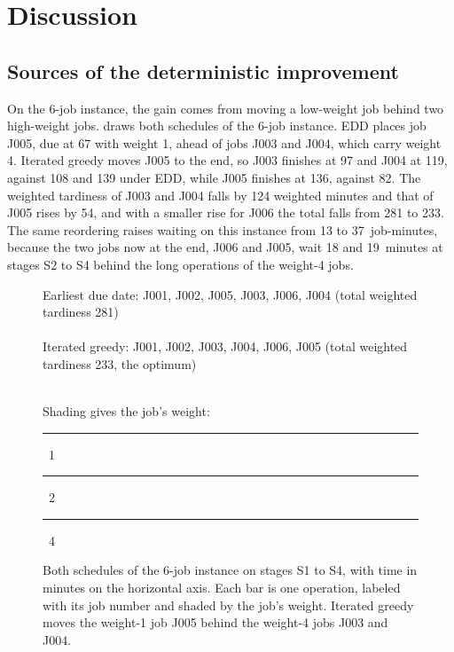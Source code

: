 \section{Discussion}\label{sec:discussion}

\subsection{Sources of the deterministic improvement}\label{sec:gain}

\sumpara On the 6-job instance, the gain comes from moving a low-weight job behind two high-weight jobs. \sumparaend
\fin {} draws both schedules of the 6-job instance. \fine
\fin EDD places job J005, due at 67 with weight 1, ahead of jobs J003 and J004, which carry weight 4. \fine
\fin Iterated greedy moves J005 to the end, so J003 finishes at 97 and J004 at 119, against 108 and 139 under EDD, while J005 finishes at 136, against 82. \fine
\fin The weighted tardiness of J003 and J004 falls by 124 weighted minutes and that of J005 rises by 54, and with a smaller rise for J006 the total falls from 281 to 233. \fine
\fin The same reordering raises waiting on this instance from 13 to 37~job-minutes, because the two jobs now at the end, J006 and J005, wait 18 and 19~minutes at stages S2 to S4 behind the long operations of the weight-4 jobs. \fine

\begin{figure}[ht]
\centering
{\footnotesize\color{muted}Earliest due date: J001, J002, J005, J003, J006, J004 (total weighted tardiness 281)}\\[2pt]
\gantt{\eddschedule}\\[6pt]
{\footnotesize\color{muted}Iterated greedy: J001, J002, J003, J004, J006, J005 (total weighted tardiness 233, the optimum)}\\[2pt]
\gantt{\igschedule}\\[4pt]
{\footnotesize\color{muted}Shading gives the job's weight:
\textcolor{w1}{\rule{0.7em}{0.7em}}~1\quad
\textcolor{w2}{\rule{0.7em}{0.7em}}~2\quad
\textcolor{w4}{\rule{0.7em}{0.7em}}~4}
\caption{Both schedules of the 6-job instance on stages S1 to S4, with time in minutes on the horizontal axis. Each bar is one operation, labeled with its job number and shaded by the job's weight. Iterated greedy moves the weight-1 job J005 behind the weight-4 jobs J003 and J004.}
\label{fig:gantt}
\end{figure}

